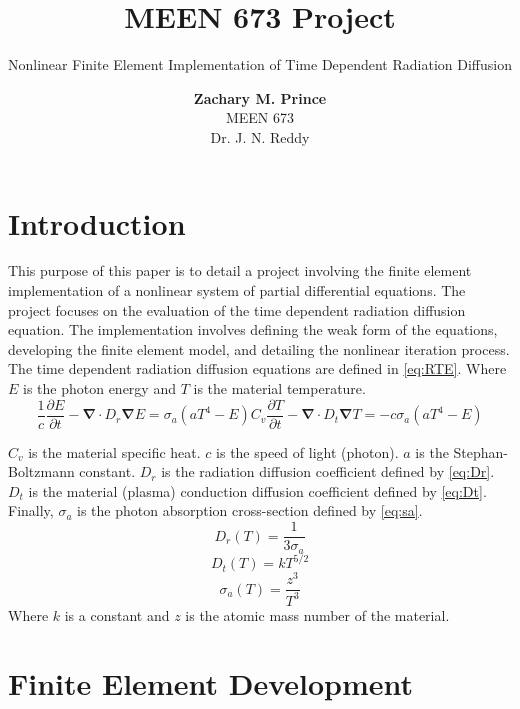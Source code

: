 \documentclass[11pt]{scrartcl}
\title{\vspace{-30mm}\normalfont MEEN 673 Project}
\subtitle{\normalfont Nonlinear Finite Element Implementation of Time Dependent Radiation Diffusion}
\author{\normalsize \textbf{Zachary M. Prince} \\
		\normalsize MEEN 673 \\
		\normalsize Dr. J. N. Reddy}
\renewcommand{\div}{\bs{\nabla}\! \cdot \!}
\newcommand{\grad}{\bs{\nabla}}
\newcommand{\bs}[1]{\mathbf{#1}}
\newcommand{\be}{\begin{equation}}
\newcommand{\ee}{\end{equation}}
\begin{document}
\maketitle
{}


\section{\bf Introduction}

This purpose of this paper is to detail a project involving the finite element implementation of a nonlinear system of partial differential equations.  The project focuses on the evaluation of the time dependent radiation diffusion equation.  The implementation involves defining the weak form of the equations, developing the finite element model, and detailing the nonlinear iteration process. \\

The time dependent radiation diffusion equations are defined in \eqref{eq:RTE}.  Where $E$ is the photon energy and $T$ is the material temperature.
\begin{subequations}
\be 
\frac{1}{c}\frac{\partial E}{\partial t} - \div D_r \grad E = \sigma_a\left(aT^4-E\right)
\ee
\be 
C_v \frac{\partial T}{\partial t} - \div D_t \grad T = -c\sigma_a\left(aT^4-E\right)
\ee
\label{eq:RTE}
\end{subequations}

$C_v$ is the material specific heat. $c$ is the speed of light (photon). $a$ is the Stephan-Boltzmann constant. $D_r$ is the radiation diffusion coefficient defined by \eqref{eq:Dr}.  $D_t$ is the material (plasma) conduction diffusion coefficient defined by \eqref{eq:Dt}. Finally, $\sigma_a$ is the photon absorption cross-section defined by \eqref{eq:sa}.
\be
D_r(T) = \frac{1}{3\sigma_a}
\label{eq:Dr}
\ee
\be
D_t(T) = kT^{5/2}
\label{eq:Dt}
\ee
\be
\sigma_a(T) = \frac{z^3}{T^3}
\label{eq:sa}
\ee
Where $k$ is a constant and $z$ is the atomic mass number of the material. 


\section{\bf Finite Element Development}
\end{document}
